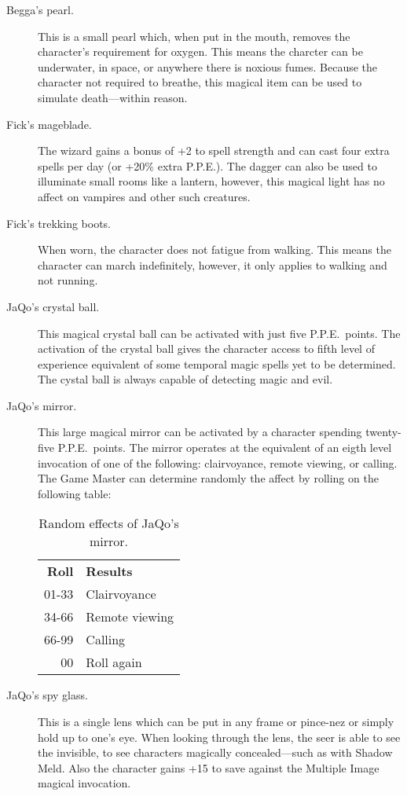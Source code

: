\begin{description}
\item[Begga's pearl.]
This is a small pearl which,
when put in the mouth,
removes the character's
requirement for oxygen.
This means the charcter can be underwater,
in space, or anywhere there is noxious fumes.
Because the character not required to breathe,
this magical item can be used to simulate death---within
reason.

\item[Fick's mageblade.]
The wizard gains a bonus of +2 to spell strength and can
cast four extra spells per day (or +20\% extra P.P.E.).
The dagger can also be used to illuminate small rooms
like a lantern,
however, this magical light has no affect on vampires
and other such creatures.

\item[Fick's trekking boots.]
When worn, the character does not fatigue from walking.
This means the character can march indefinitely,
however, it only applies to walking and not running.

\item[JaQo's crystal ball.]
This magical crystal ball can be activated with
just five P.P.E.\ points.
The activation of the crystal ball gives the
character access to fifth level of experience
equivalent of some temporal magic spells yet to
be determined.
The cystal ball is always capable of detecting
magic and evil.

\item[JaQo's mirror.] This large magical mirror
can be activated by a character spending twenty-five
P.P.E.\ points.
The mirror operates at the equivalent of an eigth
level invocation of one of the following:
clairvoyance, remote viewing, or calling.
The Game Master can determine randomly the affect
by rolling on the following table:
\begin{table}[ht]
\centering
\begin{tabular}{rl}
\toprule
{\bfseries Roll} & {\bfseries Results} \\ 
01-33&Clairvoyance \\ 
34-66&Remote viewing \\ 
66-99&Calling \\ 
00&Roll again \\
\bottomrule
\end{tabular}
\caption{Random effects of JaQo's mirror.}
\label{table-jaqo-mirror}
\end{table}

\item[JaQo's spy glass.]
This is a single lens which can be put in any frame
or pince-nez or simply hold up to one's eye.
When looking through the lens,
the seer is able to see the invisible,
to see characters magically concealed---such
as with Shadow Meld.
Also the character gains +15 to save against
the Multiple Image magical invocation.


\end{description}
